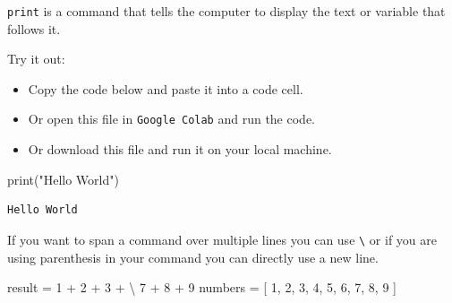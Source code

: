 \documentclass[
  letterpaper,
  DIV=11,
  numbers=noendperiod]{scrreprt}
\newenvironment{Shaded}{\begin{snugshade}}{\end{snugshade}}
\newcommand{\BuiltInTok}[1]{\textcolor[rgb]{0.00,0.23,0.31}{#1}}
\newcommand{\DecValTok}[1]{\textcolor[rgb]{0.68,0.00,0.00}{#1}}
\newcommand{\NormalTok}[1]{\textcolor[rgb]{0.00,0.23,0.31}{#1}}
\newcommand{\OperatorTok}[1]{\textcolor[rgb]{0.37,0.37,0.37}{#1}}
\newcommand{\StringTok}[1]{\textcolor[rgb]{0.13,0.47,0.30}{#1}}
\providecommand{\tightlist}{%
  \setlength{\itemsep}{0pt}\setlength{\parskip}{0pt}}\usepackage{longtable,booktabs,array}
\begin{document}
\begin{tcolorbox}[enhanced jigsaw, leftrule=.75mm, bottomrule=.15mm, colbacktitle=quarto-callout-note-color!10!white, title=\textcolor{quarto-callout-note-color}{\faInfo}\hspace{0.5em}{Example - Hello World}, breakable, arc=.35mm, toptitle=1mm, opacityback=0, titlerule=0mm, coltitle=black, colback=white, opacitybacktitle=0.6, colframe=quarto-callout-note-color-frame, left=2mm, rightrule=.15mm, toprule=.15mm, bottomtitle=1mm]

\texttt{print} is a command that tells the computer to display the text
or variable that follows it.

\end{tcolorbox}

Try it out:

\begin{itemize}
\tightlist
\item
  Copy the code below and paste it into a code cell.
\item
  Or open this file in \texttt{Google\ Colab} and run the code.
\item
  Or download this file and run it on your local machine.
\end{itemize}

\begin{Shaded}
\begin{Highlighting}[]
\BuiltInTok{print}\NormalTok{(}\StringTok{"Hello World"}\NormalTok{)}
\end{Highlighting}
\end{Shaded}

\begin{verbatim}
Hello World
\end{verbatim}

If you want to span a command over multiple lines you can use
\texttt{\textbackslash{}} or if you are using parenthesis in your
command you can directly use a new line.

\begin{Shaded}
\begin{Highlighting}[]
\NormalTok{ result }\OperatorTok{=} \DecValTok{1} \OperatorTok{+} \DecValTok{2} \OperatorTok{+} \DecValTok{3} \OperatorTok{+} \OperatorTok{\textbackslash{}}
          \DecValTok{7} \OperatorTok{+} \DecValTok{8} \OperatorTok{+} \DecValTok{9}
\NormalTok{ numbers }\OperatorTok{=}\NormalTok{ [}
     \DecValTok{1}\NormalTok{, }\DecValTok{2}\NormalTok{, }\DecValTok{3}\NormalTok{,}
     \DecValTok{4}\NormalTok{, }\DecValTok{5}\NormalTok{, }\DecValTok{6}\NormalTok{,}
     \DecValTok{7}\NormalTok{, }\DecValTok{8}\NormalTok{, }\DecValTok{9}
\NormalTok{ ]}
\end{Highlighting}
\end{Shaded}
\end{document}
